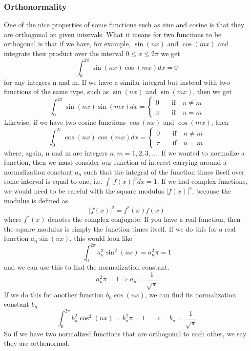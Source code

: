 \documentclass{article}
\newcommand{\be}{\begin{equation}}
\newcommand{\ee}{\end{equation}}
\begin{document}
\subsubsection*{Orthonormality}
One of the nice properties of some functions such as sine and cosine is that they are orthogonal on given intervals.
What it means for two functions to be orthogonal is that if we have, for example, $\sin(nx)$ and $\cos(mx)$ and integrate their product over the interval $0 \leq x \leq 2 \pi$ we get
\be \label{eq:sin_cos}
  \int_0^{2\pi} \sin(nx)\cos(mx) dx = 0
\ee
for any integers n and m.
If we have a similar integral but instead with two functions of the same type, such as $\sin(nx)$ and $\sin(mx)$, then we get
\be \label{eq:sin_sin_orth}
\int_0^{2\pi} \sin(nx)\sin(mx) dx =
  \left\{
    \begin{array}{ll}
      0 & \quad \text{if} \quad n \neq m \\
      \pi & \quad \text{if} \quad n = m
    \end{array}
  \right.
\ee
Likewise, if we have two cosine functions $\cos(nx)$ and $\cos(mx)$, then
\be \label{eq:cos_cos_orth}
\int_0^{2\pi} \cos(nx)\cos(mx) dx =
  \left\{
    \begin{array}{ll}
      0 & \quad \text{if} \quad n \neq m \\
      \pi & \quad \text{if} \quad n = m
    \end{array}
  \right.
\ee
where, again, n and m are integers $n,m = 1, 2, 3, \hdots$.
If we wanted to normalize a function, then we must consider our function of interest carrying around a normalization constant $a_n$ such that the integral of the function times itself over some interval is equal to one, i.e. $\int |f(x)|^2 dx = 1$.
If we had complex functions, we would need to be careful with the square modulus $|f(x)|^2$, because the modulus is defined as
\be
  |f(x)|^2 = f^*(x) f(x)
\ee
where $f^*(x)$ denotes the complex conjugate.
If you have a real function, then the square modulus is simply the function times itself.
If we do this for a real function $a_n \sin(nx)$, this would look like
\be \label{eq:sin_sin_norm_norm}
  \int_0^{2\pi} a_n^2 \sin^2(nx) = a_n^2\pi = 1
\ee
and we can use this to find the normalization constant.
\be
  a_n^2\pi = 1 \Rightarrow a_n = \frac{1}{\sqrt{\pi}}
\ee
If we do this for another function $b_n \cos(nx)$, we can find its normalization constant $b_n$
\be \label{eq:cos_cos_norm_norm}
  \int_0^{2\pi} b_n^2 \cos^2(nx) = b_n^2\pi = 1 \quad \Rightarrow \quad b_n = \frac{1}{\sqrt{\pi}}
\ee
So if we have two normalized functions that are orthogonal to each other, we say they are orthonormal.
\end{document}
